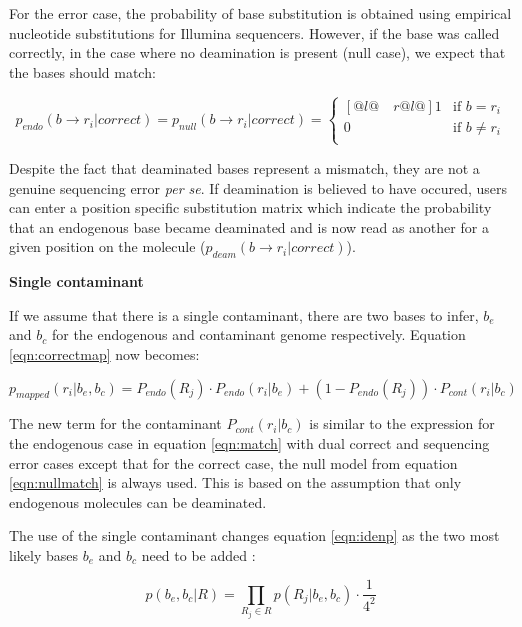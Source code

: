 \documentclass[a4paper,12pt]{article}
\begin{document}
\noindent For the error case, the probability of base substitution is obtained using empirical nucleotide substitutions for Illumina sequencers. However, if the base was called correctly, in the case where no deamination is present (null case), we expect that the bases should match:

\begin{equation}
p_{endo}(b \to r_i | correct) =   p_{null}(b \to r_i | correct)   = \begin{cases}[@{}l@{\quad}r@{}l@{}]
    1  &  \text{if }  b = r_i    \\
    0 &  \text{if }  b \ne r_i    \\
  \end{cases}
\label{eqn:nullmatch}
\end{equation} 

\noindent Despite the fact that deaminated bases represent a mismatch, they are not a genuine sequencing error {\it per se}. If deamination is believed to have occured, users can enter a position specific substitution matrix which indicate the probability that an endogenous base became deaminated and is now read as another for a given position on the molecule ($p_{deam}(b \to r_i | correct)$). 

{\bf Single contaminant}

If we assume that there is a single contaminant, there are two bases to infer, $b_e$ and $b_c$ for the endogenous and contaminant genome respectively. Equation \ref{eqn:correctmap} now becomes:

\begin{equation}
p_{mapped}(r_i|b_e,b_c) =  P_{endo}(R_j) \cdot P_{endo} (r_i|b_e)   + (1-P_{endo}(R_j)) \cdot P_{cont} (r_i|b_c)
\end{equation}

\noindent The new term for the contaminant $P_{cont} (r_i|b_c)$ is similar to the expression for the endogenous case in equation \ref{eqn:match} with dual correct and sequencing error cases except that for the correct case, the null model from equation \ref{eqn:nullmatch} is always used. This is based on the assumption that only endogenous molecules can be deaminated. 

The use of the single contaminant changes equation \ref{eqn:idenp} as the two most likely bases $b_e$ and $b_c$ need to be added :

\begin{equation}
  p(b_e,b_c|R)   = \prod_{R_j \in R} p(R_j|b_e,b_c) \cdot \frac {1} {4^2} 
\end{equation} 
\end{document}
